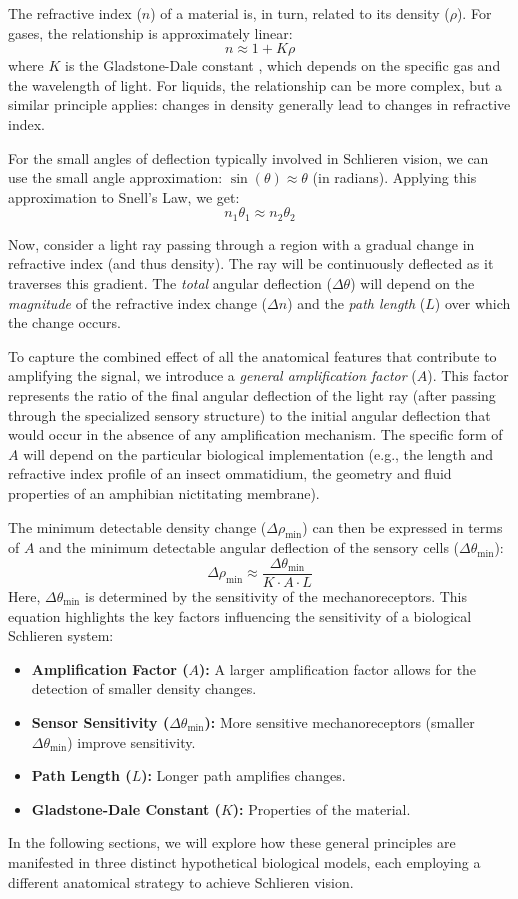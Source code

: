 \documentclass[11pt]{article}
\begin{document}
The refractive index ($n$) of a material is, in turn, related to its density ($\rho$). For gases, the relationship is approximately linear:
\[n \approx 1 + K\rho\]
where $K$ is the Gladstone-Dale constant \cite{Gladstone1863Refraction}, which depends on the specific gas and the wavelength of light. For liquids, the relationship can be more complex, but a similar principle applies: changes in density generally lead to changes in refractive index.

For the small angles of deflection typically involved in Schlieren vision, we can use the small angle approximation: $\sin(\theta) \approx \theta$ (in radians). Applying this approximation to Snell's Law, we get:
\[n_1\theta_1 \approx n_2\theta_2\]

Now, consider a light ray passing through a region with a gradual change in refractive index (and thus density). The ray will be continuously deflected as it traverses this gradient. The \textit{total} angular deflection ($\Delta\theta$) will depend on the \textit{magnitude} of the refractive index change ($\Delta n$) and the \textit{path length} ($L$) over which the change occurs.

To capture the combined effect of all the anatomical features that contribute to amplifying the signal, we introduce a \textit{general amplification factor} ($A$). This factor represents the ratio of the final angular deflection of the light ray (after passing through the specialized sensory structure) to the initial angular deflection that would occur in the absence of any amplification mechanism. The specific form of $A$ will depend on the particular biological implementation (e.g., the length and refractive index profile of an insect ommatidium, the geometry and fluid properties of an amphibian nictitating membrane).

The minimum detectable density change ($\Delta\rho_{\text{min}}$) can then be expressed in terms of $A$ and the minimum detectable angular deflection of the sensory cells ($\Delta\theta_{\text{min}}$):
\[\Delta\rho_{\text{min}} \approx \frac{\Delta\theta_{\text{min}}}{K \cdot A \cdot L}\]
Here, $\Delta\theta_{\text{min}}$ is determined by the sensitivity of the mechanoreceptors. This equation highlights the key factors influencing the sensitivity of a biological Schlieren system:
\begin{itemize}
    \item \textbf{Amplification Factor ($A$):} A larger amplification factor allows for the detection of smaller density changes.
    \item \textbf{Sensor Sensitivity ($\Delta\theta_{\text{min}}$):} More sensitive mechanoreceptors (smaller $\Delta\theta_{\text{min}}$) improve sensitivity.
    \item \textbf{Path Length ($L$):} Longer path amplifies changes.
    \item \textbf{Gladstone-Dale Constant ($K$):} Properties of the material.
\end{itemize}
In the following sections, we will explore how these general principles are manifested in three distinct hypothetical biological models, each employing a different anatomical strategy to achieve Schlieren vision.
\end{document}

